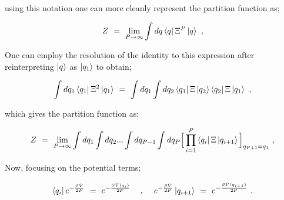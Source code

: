 \documentclass{ece}
\begin{document}
using this notation one can more cleanly represent the partition function as;

\begin{equation} \label{eq:12}
Z \hspace{0.125cm} = \hspace{0.125cm}  \lim_{P \rightarrow \infty} \int dq \bra{q} \Xi^P \ket{q} \hspace{0.125cm} , 
\end{equation}

One can employ the resolution of the identity to this expression after reinterpreting \begin{math} \ket{q} \end{math} as \begin{math} \ket{q_1}\end{math} to obtain; 

\begin{equation} \label{eq:13}
\int dq_1 \bra{q_1} \Xi^2 \ket{q_1} \hspace{0.125cm} = \hspace{0.125cm} \int dq_1 \int dq_2 \bra{q_1} \Xi \ket{q_2} \bra{q_2} \Xi \ket{q_1} \hspace{0.125cm} , 
\end{equation}

which gives the partition function as;

\begin{equation} \label{eq:14}
Z \hspace{0.125cm} = \hspace{0.125cm}  \lim_{P \rightarrow \infty} \int dq_1 \int dq_2 ... \int dq_{P - 1} \int dq_P \Big[ \prod_{i=1}^{P} \bra{q_i} \Xi \ket{q_{i+1}} \Big]_{q_{P+1} = q_1} \hspace{0.125cm} , 
\end{equation}

Now, focusing on the potential terms;

\begin{equation} \label{eq:15}
\bra{q_i} e^{-\frac{\beta \hat{V}}{2 P}} \hspace{0.125cm} = \hspace{0.125cm} e^{-\frac{\beta \hat{V}(q_i)}{2 P}} \hspace{0.425cm} , \hspace{0.425cm} e^{-\frac{\beta \hat{V}}{2 P}} \ket{q_{i+1}} \hspace{0.125cm} = \hspace{0.125cm} e^{-\frac{\beta \hat{V}(q_{i+1})}{2 P}} \hspace{0.125cm} .
\end{equation}
\end{document}
